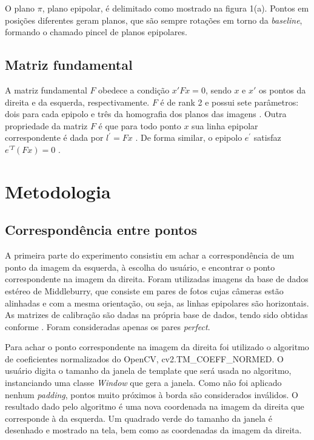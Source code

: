 \documentclass{bmvc2k}
\begin{document}
O plano $\pi$, plano epipolar, é delimitado como mostrado na figura 1(a). Pontos em posi\c{c}ões diferentes geram planos, que são sempre rota\c{c}ões em torno da \textit{baseline}, formando o chamado pincel de planos epipolares\cite{Zisserman}. 

\subsection{Matriz fundamental}

A matriz fundamental $F$ obedece a condi\c{c}ão $x'Fx = 0$, sendo $x$ e $x'$ os pontos da direita e da esquerda, respectivamente. $F$ é de rank 2 e possui sete parâmetros: dois para cada epipolo e três da homografia dos planos das imagens \cite{Gary}. Outra propriedade da matriz $F$ é que para todo ponto $x$ sua linha epipolar correspondente é dada por $l^{\prime} = Fx$ \cite{Zisserman}. De forma similar, o epipolo $e^{\prime}$ satisfaz $e^{{\prime}T}(F x) = 0$ \cite{Zisserman}.

\section{Metodologia}

\subsection {Correspondência entre pontos}
A primeira parte do experimento consistiu em achar a correspondência de um ponto da imagem da esquerda, à escolha do usuário, e encontrar o ponto correspondente na imagem da direita. Foram utilizadas imagens da base de dados estéreo de Middleburry\cite{Middle}, que consiste em pares de fotos cujas câmeras estão alinhadas e com a mesma orienta\c{c}ão, ou seja, as linhas epipolares são horizontais. As matrizes de calibra\c{c}ão são dadas na própria base de dados, tendo sido obtidas conforme \cite{Daniel}. Foram consideradas apenas os pares \textit{perfect}. 

Para achar o ponto correspondente na imagem da direita foi utilizado o algoritmo de coeficientes normalizados do OpenCV, cv2.TM\_COEFF\_NORMED\cite{cv}. O usuário digita o tamanho da janela de template que será usada no algoritmo, instanciando uma classe \textit{Window} que gera a janela. Como não foi aplicado nenhum \textit{padding}, pontos muito próximos à borda são considerados inválidos. O resultado dado pelo algoritmo é uma nova coordenada na imagem da direita que corresponde à da esquerda. Um quadrado verde do tamanho da janela é desenhado e mostrado na tela, bem como as coordenadas da imagem da direita.
\end{document}
